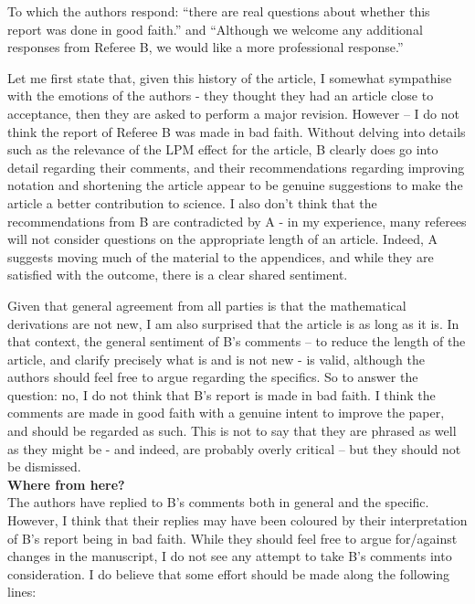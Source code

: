 \documentclass[12pt]{article}
\begin{document}
To which the authors respond: ``there are real questions about whether this report was done in good faith.'' and ``Although we welcome any additional responses from Referee B, we would like a more professional response.''

Let me first state that, given this history of the article, I somewhat sympathise with the emotions of the authors - they thought they had an article close to acceptance, then they are asked to perform a major revision.  However – I do not think the report of Referee B was made in bad faith. Without delving into details such as the relevance of the LPM effect for the article, B clearly does go into detail regarding their comments, and their recommendations regarding improving notation and shortening the article appear to be genuine suggestions to make the article a better contribution to science.  I also don’t think that the recommendations from B are contradicted by A - in my experience, many referees will not consider questions on the appropriate length of an article. Indeed, A suggests moving much of the material to the appendices, and while they are satisfied with the outcome, there is a clear shared sentiment.

Given that general agreement from all parties is that the mathematical derivations are not new, I am also surprised that the article is as long as it is. In that context, the general sentiment of B’s comments – to reduce the length of the article, and clarify precisely what is and is not new - is valid, although the authors should feel free to argue regarding the specifics. So to answer the question: no, I do not think that B’s report is made in bad faith. I think the comments are made in good faith with a genuine intent to improve the paper, and should be regarded as such. This is not to say that they are phrased as well as they might be - and indeed, are probably overly critical – but they should not be dismissed. \\

\textbf{Where from here?} \\

The authors have replied to B’s comments both in general and the specific. However, I think that their replies may have been coloured by their interpretation of B’s report being in bad faith. While they should feel free to argue for/against changes in the manuscript, I do not see any attempt to take B’s comments into consideration.  I do believe that some effort should be made along the following lines:
\end{document}
